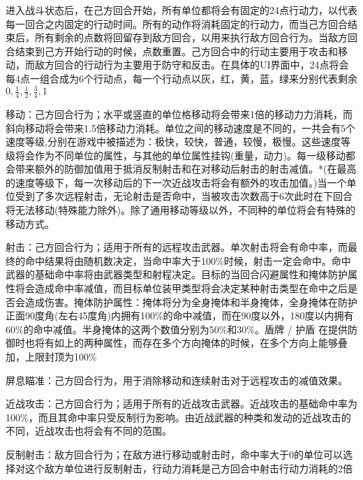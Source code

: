 \documentclass[10pt, a4paper]{article}
\begin{document}
        进入战斗状态后，在己方回合开始，所有单位都将会有固定的{\color{red}24}点行动力，以代表每一回合之内固定的行动时间。所有的动作将消耗固定的行动力，而当己方回合结束后，所有剩余的点数将回留存到敌方回合，以用来执行敌方回合行为。当敌方回合结束到己方开始行动的时候，点数重置。己方回合中的行动主要用于攻击和移动，而敌方回合的行动行为主要用于防守和反击。在具体的UI界面中，24点将会每4点一组合成为{\color{red}6}个行动点，每一个行动点以灰，红，黄，蓝，绿来分别代表剩余 $0, \frac{1}{4}, \frac{1}{2},\frac{3}{4}, 1$

        \medskip

        移动：己方回合行为；水平或竖直的单位格移动将会带来1倍的移动力力消耗，而斜向移动将会带来1.5倍移动力消耗。单位之间的移动速度是不同的，一共会有5个速度等级,分别在游戏中被描述为：极快，较快，普通，较慢，极慢。这些速度等级将会作为不同单位的属性，与其他的单位属性挂钩(重量，动力)。每一级移动都会带来额外的防御加值用于抵消反制射击和在对移动后射击的射击减值。*(在最高的速度等级下，每一次移动后的下一次近战攻击将会有额外的攻击加值。)当一个单位受到了多次远程射击，无论射击是否命中，当被攻击次数高于{\color{red}6次}此时在下回合将无法移动(特殊能力除外)。除了通用移动等级以外，不同种的单位将会有特殊的移动方式。

        \medskip

        射击：己方回合行为；适用于所有的远程攻击武器。单次射击将会有命中率，而最终的命中结果将由随机数决定，当命中率大于100\%时候，射击一定会命中。命中武器的基础命中率将由武器类型和射程决定。目标的当回合闪避属性和掩体防护属性将会造成命中率减值，而目标单位装甲类型将会决定某种射击类型在命中之后是否会造成伤害。掩体防护属性：掩体将分为全身掩体和半身掩体，全身掩体在防护正面90度角(左右45度角)内拥有100\%的命中减值，而在90度以外，180度以内拥有60\%的命中减值。半身掩体的这两个数值分别为50\%和30\%。盾牌 / 护盾 在提供防御时也将有如上的两种属性，而存在多个方向掩体的时候，在多个方向上能够叠加，上限封顶为100\%

        \medskip

        屏息瞄准：己方回合行为，用于消除{\color{red}移动}和{\color{red}连续射击}对于远程攻击的减值效果。

        \medskip 

        近战攻击：己方回合行为；适用于所有的近战攻击武器。近战攻击的基础命中率为100\%，而且其命中率只受反制行为影响。由近战武器的种类和发动的近战攻击的不同，近战攻击也将会有不同的范围。

        \medskip

        反制射击：敌方回合行为；在敌方进行移动或射击时，命中率大于0的单位可以选择对这个敌方单位进行反制射击，行动力消耗是己方回合中射击行动力消耗的{\color{red}2倍}
\end{document}
